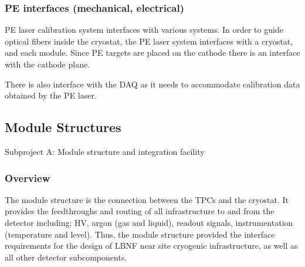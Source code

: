 \subsubsection{PE  interfaces (mechanical, electrical)}
PE laser calibration system interfaces with various systems. In order to guide optical fibers inside the cryostat, the PE laser system interfaces with a cryostat, and each module. 
Since PE targets are placed on the cathode there is an interface with the cathode plane. 
        
There is also interface with the DAQ as it needs to accommodate calibration data obtained by the PE laser.

\subsection{Module Structures}
\label{sec:lartpc-des-modstruc}
Subproject A: Module structure and integration facility
\subsubsection{Overview}

The module structure is the connection between the TPCs and the cryostat. It provides the feedthroughs and routing of all infrastructure to and from the detector including: HV, argon (gas and liquid), readout signals, instrumentation (temperature and level). Thus, the module structure provided the interface requirements for the design of LBNF near site cryogenic infrastructure, as well as all other detector subcomponents.

